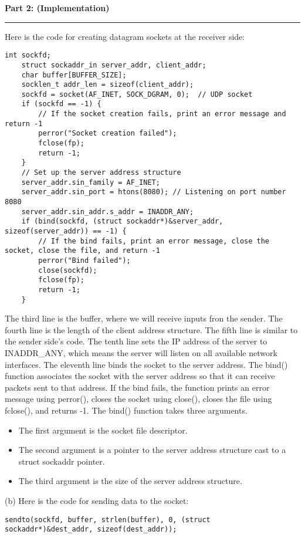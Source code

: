 \documentclass[a4paper,12pt]{article}
\newenvironment{solution}[2][]{%
    \begin{mdframed}[linecolor=blue!70!black, linewidth=2pt, roundcorner=10pt, backgroundcolor=yellow!10!white, skipabove=12pt, skipbelow=12pt]%
        \textbf{\large #2}
        \par\noindent\rule{\textwidth}{0.4pt}
}{
    \end{mdframed}
}
\begin{document}
\begin{solution}{Part 2: (Implementation)}
Here is the code for creating datagram sockets at the receiver side:
\begin{lstlisting}[caption=Sender Datagram Socket Creation]
    int sockfd;
    struct sockaddr_in server_addr, client_addr;
    char buffer[BUFFER_SIZE];
    socklen_t addr_len = sizeof(client_addr);
    sockfd = socket(AF_INET, SOCK_DGRAM, 0);  // UDP socket
    if (sockfd == -1) {
        // If the socket creation fails, print an error message and return -1
        perror("Socket creation failed");
        fclose(fp);
        return -1;
    }
    // Set up the server address structure
    server_addr.sin_family = AF_INET;
    server_addr.sin_port = htons(8080); // Listening on port number 8080
    server_addr.sin_addr.s_addr = INADDR_ANY;
    if (bind(sockfd, (struct sockaddr*)&server_addr, sizeof(server_addr)) == -1) {
        // If the bind fails, print an error message, close the socket, close the file, and return -1
        perror("Bind failed");
        close(sockfd);
        fclose(fp);
        return -1;
    }
\end{lstlisting}

The third line is the buffer, where we will receive inputs fron the sender. The fourth line is the length of the client address structure. The fifth line is similar to the sender side's code. The tenth line sets the IP address of the server to INADDR\_ANY, which means the server will listen on all available network interfaces. The eleventh line binds the socket to the server address. The bind() function associates the socket with the server address so that it can receive packets sent to that address. If the bind fails, the function prints an error message using perror(), closes the socket using close(), closes the file using fclose(), and returns -1. The bind() function takes three arguments.
\begin{itemize}
    \item The first argument is the socket file descriptor.
    \item The second argument is a pointer to the server address structure cast to a struct sockaddr pointer.
    \item The third argument is the size of the server address structure.
\end{itemize}


(b) Here is the code for sending data to the socket:

\begin{lstlisting}[caption=Sending Data to the Socket]
    sendto(sockfd, buffer, strlen(buffer), 0, (struct sockaddr*)&dest_addr, sizeof(dest_addr));
\end{lstlisting}

\end{solution}
\end{document}
